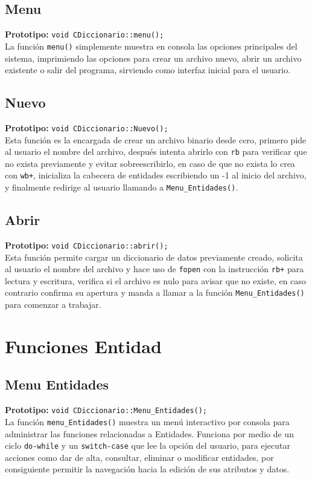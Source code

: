 \documentclass[12pt]{article}
\begin{document}
\subsection*{Menu}
\textbf{Prototipo:} \verb|void CDiccionario::menu();|\\
La función \verb|menu()| simplemente muestra en consola las opciones 
principales del sistema, imprimiendo las opciones para crear un archivo nuevo, 
abrir un archivo existente o salir del programa, sirviendo como interfaz 
inicial para el usuario.

{}
\subsection*{Nuevo}
\textbf{Prototipo:} \verb|void CDiccionario::Nuevo();|\\
Esta función es la encargada de crear un archivo binario desde cero, primero 
pide al usuario el nombre del archivo, después intenta abrirlo con 
\verb|rb| para verificar que no exista previamente y evitar sobreescribirlo, 
en caso de que no exista lo crea con \verb|wb+|, inicializa la cabecera de 
entidades escribiendo un -1 al inicio del archivo, y finalmente redirige al 
usuario llamando a \verb|Menu_Entidades()|.

{}
\subsection*{Abrir}
\textbf{Prototipo:} \verb|void CDiccionario::abrir();|\\
Esta función permite cargar un diccionario de datos previamente creado, 
solicita al usuario el nombre del archivo y hace uso de \verb|fopen| con la 
instrucción \verb|rb+| para lectura y escritura, verifica si el archivo es 
nulo para avisar que no existe, en caso contrario confirma su apertura y 
manda a llamar a la función \verb|Menu_Entidades()| para comenzar a trabajar.

\newpage
\section[Funciones Entidad]{Funciones \hfill \fontsize{14}{17}\selectfont Entidad}

{}
\subsection*{Menu Entidades}
\textbf{Prototipo:} \verb|void CDiccionario::Menu_Entidades();|\\
La función \verb|menu_Entidades()| muestra un menú interactivo por consola para administrar
las funciones relacionadas a Entidades. Funciona por medio de un ciclo \texttt{do-while}
y un \texttt{switch-case} que lee la opción del usuario, para ejecutar acciones como
dar de alta, consultar, eliminar o modificar entidades, por consiguiente permitir
la navegación hacia la edición de sus atributos y datos.
\end{document}
